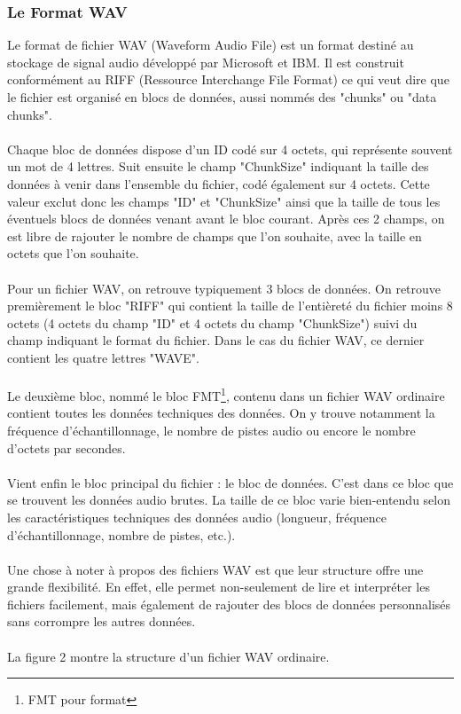 \documentclass[11pt]{article}
\begin{document}
\subsubsection{Le Format WAV}

Le format de fichier WAV (Waveform Audio File) est un format destiné au stockage de signal audio développé par Microsoft et IBM.
Il est construit conformément au RIFF (Ressource Interchange File Format) ce qui veut dire que le fichier est organisé en blocs de données, aussi nommés des "chunks" ou "data chunks".\\
\\
Chaque bloc de données dispose d'un ID codé sur 4 octets, qui représente souvent un mot de 4 lettres.
Suit ensuite le champ "ChunkSize" indiquant la taille des données à venir dans l'ensemble du fichier, codé également sur 4 octets.
Cette valeur exclut donc les champs "ID" et "ChunkSize" ainsi que la taille de tous les éventuels blocs de données venant avant le bloc courant.
Après ces 2 champs, on est libre de rajouter le nombre de champs que l'on souhaite, avec la taille en octets que l'on souhaite.\\
\\
Pour un fichier WAV, on retrouve typiquement 3 blocs de données.
On retrouve premièrement le bloc "RIFF" qui contient la taille de l'entièreté du fichier moins 8 octets (4 octets du champ "ID" et 4 octets du champ "ChunkSize") suivi du champ indiquant le format du fichier.
Dans le cas du fichier WAV, ce dernier contient les quatre lettres "WAVE".\\
\\
Le deuxième bloc, nommé le bloc FMT\footnote{FMT pour format}, contenu dans un fichier WAV ordinaire contient toutes les données techniques des données.
On y trouve notamment la fréquence d'échantillonnage, le nombre de pistes audio ou encore le nombre d'octets par secondes.\\
\\
Vient enfin le bloc principal du fichier : le bloc de données.
C'est dans ce bloc que se trouvent les données audio brutes.
La taille de ce bloc varie bien-entendu selon les caractéristiques techniques des données audio (longueur, fréquence d'échantillonnage, nombre de pistes, etc.).\\
\\
Une chose à noter à propos des fichiers WAV est que leur structure offre une grande flexibilité.
En effet, elle permet non-seulement de lire et interpréter les fichiers facilement, mais également de rajouter des blocs de données personnalisés sans corrompre les autres données.\\
\\
La figure 2 montre la structure d'un fichier WAV ordinaire.
\end{document}
